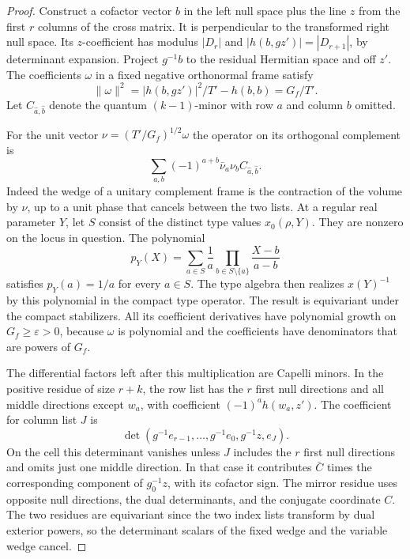 \begin{proof}

Construct a cofactor vector \(b\) in the left null space
plus the line \(z\) from the first \(r\) columns of the
cross matrix. It is perpendicular to the transformed right
null space. Its \(z\)-coefficient has modulus \(|D_r|\)
and \(|h(b,gz')|=|D_{r+1}|\), by determinant expansion.
Project \(g^{-1}b\) to the residual Hermitian space and
off \(z'\). The coefficients \(\omega\) in a fixed
negative orthonormal frame satisfy
\[
 \|\omega\|^2=|h(b,gz')|^2/T'-h(b,b)=G_f/T' .
\]
Let \(C_{\widehat a,\widehat b}\) denote the quantum
\((k-1)\)-minor with row \(a\) and column \(b\) omitted.

For the unit vector \(\nu=(T'/G_f)^{1/2}\omega\) the
operator on its orthogonal complement is
\[
       \sum_{a,b}(-1)^{a+b}\bar\nu_a\nu_b
                         C_{\widehat a,\widehat b}.
\]
Indeed the wedge of a unitary complement frame is the
contraction of the volume by \(\nu\), up to a unit phase
that cancels between the two lists. At a regular real parameter \(Y\), let \(S\) consist of the distinct type values \(x_0(\rho,Y)\). They are nonzero on the locus in question. The polynomial
\[
 p_Y(X)=\sum_{a\in S}\frac{1}{a}
             \prod_{b\in S\setminus\{a\}}\frac{X-b}{a-b}
\]
satisfies \(p_Y(a)=1/a\) for every \(a\in S\). The type algebra then realizes \(x(Y)^{-1}\)
by this polynomial in the compact type operator. The
result is equivariant under the compact stabilizers.
All its coefficient derivatives have polynomial growth
on \(G_f\ge\varepsilon>0\), because \(\omega\) is
polynomial and the coefficients have denominators that
are powers of \(G_f\).


The differential factors left after this multiplication
are Capelli minors. In the positive residue of size
\(r+k\), the row list has the \(r\) first null directions
and all middle directions except \(w_a\), with coefficient
\((-1)^a h(w_a,z')\). The coefficient for column list
\(J\) is
\[
 \det(g^{-1}e_{r-1},\ldots,g^{-1}e_0,g^{-1}z,e_J).
\]
On the cell this determinant vanishes unless \(J\) includes
the \(r\) first null directions and omits just one middle
direction. In that case it contributes \(\bar C\) times
the corresponding component of \(g_0^{-1}z\), with its
cofactor sign. The mirror residue uses opposite null
directions, the dual determinants, and the conjugate
coordinate \(C\). The two residues are equivariant since
the two index lists transform by dual exterior powers,
so the determinant scalars of the fixed wedge and the
variable wedge cancel.


\end{proof}
